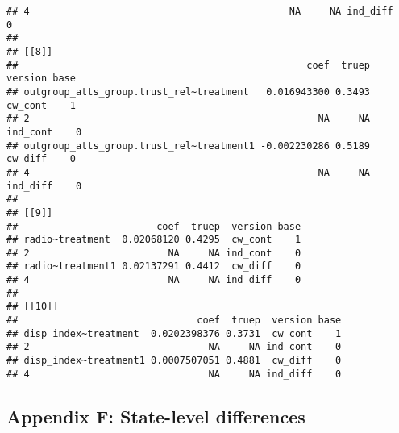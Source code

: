 \documentclass[
]{article}
\begin{document}
\begin{verbatim}
## 4                                             NA     NA ind_diff    0
## 
## [[8]]
##                                                  coef  truep  version base
## outgroup_atts_group.trust_rel~treatment   0.016943300 0.3493  cw_cont    1
## 2                                                  NA     NA ind_cont    0
## outgroup_atts_group.trust_rel~treatment1 -0.002230286 0.5189  cw_diff    0
## 4                                                  NA     NA ind_diff    0
## 
## [[9]]
##                        coef  truep  version base
## radio~treatment  0.02068120 0.4295  cw_cont    1
## 2                        NA     NA ind_cont    0
## radio~treatment1 0.02137291 0.4412  cw_diff    0
## 4                        NA     NA ind_diff    0
## 
## [[10]]
##                               coef  truep  version base
## disp_index~treatment  0.0202398376 0.3731  cw_cont    1
## 2                               NA     NA ind_cont    0
## disp_index~treatment1 0.0007507051 0.4881  cw_diff    0
## 4                               NA     NA ind_diff    0
\end{verbatim}

\hypertarget{appendix-f-state-level-differences}{%
\subsection{Appendix F: State-level
differences}\label{appendix-f-state-level-differences}}
\end{document}
